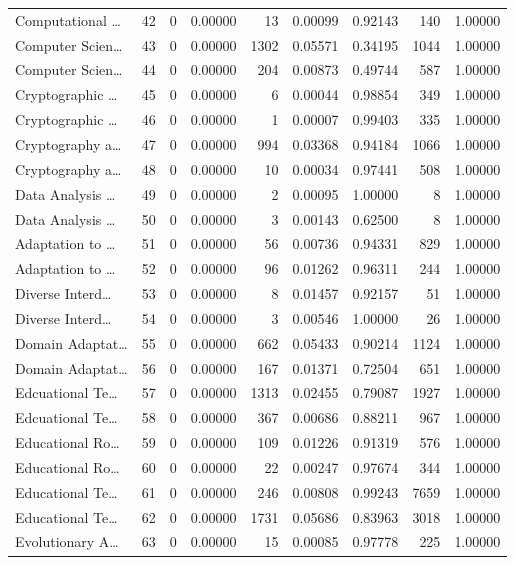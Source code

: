 \begin{table}
\begin{tabular}{lrrrrrrrr}
Computational … & 42 & 0 & 0.00000 & 13 & 0.00099 & 0.92143 & 140 & 1.00000 \\
Computer Scien… & 43 & 0 & 0.00000 & 1302 & 0.05571 & 0.34195 & 1044 & 1.00000 \\
Computer Scien… & 44 & 0 & 0.00000 & 204 & 0.00873 & 0.49744 & 587 & 1.00000 \\
Cryptographic … & 45 & 0 & 0.00000 & 6 & 0.00044 & 0.98854 & 349 & 1.00000 \\
Cryptographic … & 46 & 0 & 0.00000 & 1 & 0.00007 & 0.99403 & 335 & 1.00000 \\
Cryptography a… & 47 & 0 & 0.00000 & 994 & 0.03368 & 0.94184 & 1066 & 1.00000 \\
Cryptography a… & 48 & 0 & 0.00000 & 10 & 0.00034 & 0.97441 & 508 & 1.00000 \\
Data Analysis … & 49 & 0 & 0.00000 & 2 & 0.00095 & 1.00000 & 8 & 1.00000 \\
Data Analysis … & 50 & 0 & 0.00000 & 3 & 0.00143 & 0.62500 & 8 & 1.00000 \\
Adaptation to … & 51 & 0 & 0.00000 & 56 & 0.00736 & 0.94331 & 829 & 1.00000 \\
Adaptation to … & 52 & 0 & 0.00000 & 96 & 0.01262 & 0.96311 & 244 & 1.00000 \\
Diverse Interd… & 53 & 0 & 0.00000 & 8 & 0.01457 & 0.92157 & 51 & 1.00000 \\
Diverse Interd… & 54 & 0 & 0.00000 & 3 & 0.00546 & 1.00000 & 26 & 1.00000 \\
Domain Adaptat… & 55 & 0 & 0.00000 & 662 & 0.05433 & 0.90214 & 1124 & 1.00000 \\
Domain Adaptat… & 56 & 0 & 0.00000 & 167 & 0.01371 & 0.72504 & 651 & 1.00000 \\
Edcuational Te… & 57 & 0 & 0.00000 & 1313 & 0.02455 & 0.79087 & 1927 & 1.00000 \\
Edcuational Te… & 58 & 0 & 0.00000 & 367 & 0.00686 & 0.88211 & 967 & 1.00000 \\
Educational Ro… & 59 & 0 & 0.00000 & 109 & 0.01226 & 0.91319 & 576 & 1.00000 \\
Educational Ro… & 60 & 0 & 0.00000 & 22 & 0.00247 & 0.97674 & 344 & 1.00000 \\
Educational Te… & 61 & 0 & 0.00000 & 246 & 0.00808 & 0.99243 & 7659 & 1.00000 \\
Educational Te… & 62 & 0 & 0.00000 & 1731 & 0.05686 & 0.83963 & 3018 & 1.00000 \\
Evolutionary A… & 63 & 0 & 0.00000 & 15 & 0.00085 & 0.97778 & 225 & 1.00000 \\

\end{tabular}
\end{table}
